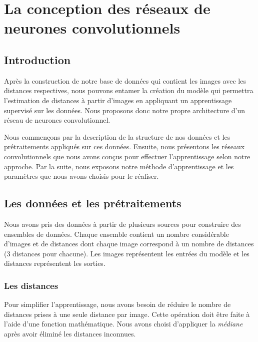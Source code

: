 \chapter{La conception des réseaux de neurones convolutionnels}

\section{Introduction}

Après la construction de notre base de données qui contient les images avec
les distances respectives, nous pouvons entamer la création du modèle qui
permettra l'estimation de distances à partir d'images en appliquant un
apprentissage supervisé sur les données. Nous proposons donc notre propre
architecture d'un réseau de neurones convolutionnel.

Nous commençons par la description de la structure de nos
données et les prétraitements appliqués sur ces données. Ensuite, nous présentons
les réseaux convolutionnels que nous avons conçus pour effectuer l'apprentissage
selon notre approche.
Par la suite, nous exposons notre méthode d'apprentissage et les paramètres
que nous avons choisis pour le réaliser.

\section{Les données et les prétraitements}

Nous avons pris des données à partir de plusieurs sources pour construire des
ensembles de données. Chaque ensemble contient un nombre considérable d'images et
de distances dont chaque image correspond à un nombre de distances ($3$ distances
pour chacune). Les images représentent les entrées du modèle et les distances
représentent les sorties.

\subsection{Les distances}

Pour simplifier l'apprentissage, nous avons besoin de réduire le nombre de
distances prises à une seule distance par image. Cette opération doit être faite
à l'aide d'une fonction mathématique. Nous avons choisi d'appliquer la
\emph{médiane} après avoir éliminé les distances inconnues.

